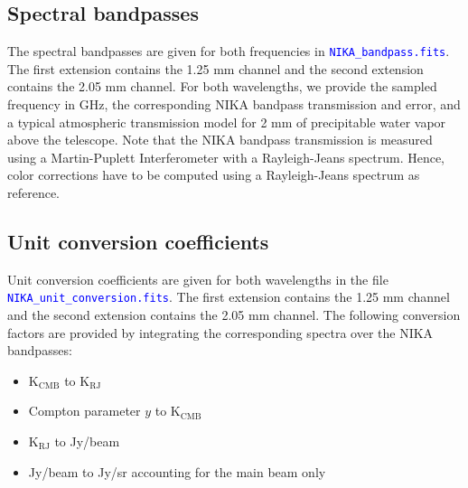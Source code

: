 \documentclass[a4paper,10pt]{article}
\begin{document}
\subsection{Spectral bandpasses}
The spectral bandpasses are given for both frequencies in \textcolor{blue}{{\tt NIKA\_bandpass.fits}}. The first extension contains the 1.25 mm channel and the second extension contains the 2.05 mm channel. For both wavelengths, we provide the sampled frequency in GHz, the corresponding NIKA bandpass transmission and error, and a typical atmospheric transmission model for 2 mm of precipitable water vapor above the telescope. Note that the NIKA bandpass transmission is measured using a Martin-Puplett Interferometer with a Rayleigh-Jeans spectrum. Hence, color corrections have to be computed using a Rayleigh-Jeans spectrum as reference.

\subsection{Unit conversion coefficients}
Unit conversion coefficients are given for both wavelengths in the file \textcolor{blue}{{\tt NIKA\_unit\_conversion.fits}}. The first extension contains the 1.25 mm channel and the second extension contains the 2.05 mm channel. The following conversion factors are provided by integrating the corresponding spectra over the NIKA bandpasses:
	\begin{itemize}
	\item K$_{\mathrm{CMB}}$ to K$_{\mathrm{RJ}}$ 
	\item Compton parameter $y$ to K$_{\mathrm{CMB}}$
	\item K$_{\mathrm{RJ}}$ to Jy/beam
	\item Jy/beam to Jy/sr accounting for the main beam only
	\end{itemize}
	
\end{document}
